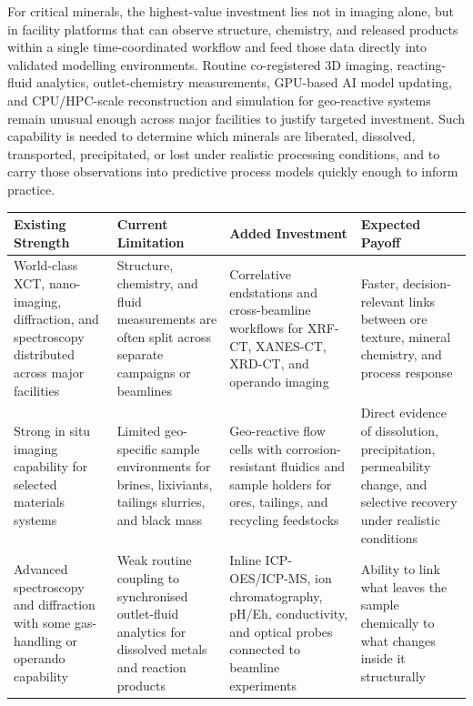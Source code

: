 \documentclass[12pt,a4paper]{article}
\begin{document}
For critical minerals, the highest-value investment lies not in imaging alone, but in facility platforms that can observe structure, chemistry, and released products within a single time-coordinated workflow and feed those data directly into validated modelling environments. Routine co-registered 3D imaging, reacting-fluid analytics, outlet-chemistry measurements, GPU-based AI model updating, and CPU/HPC-scale reconstruction and simulation for geo-reactive systems remain unusual enough across major facilities to justify targeted investment. Such capability is needed to determine which minerals are liberated, dissolved, transported, precipitated, or lost under realistic processing conditions, and to carry those observations into predictive process models quickly enough to inform practice.

\begin{table}[htbp]
\centering
\footnotesize
\setlength{\tabcolsep}{6pt}
\renewcommand{\arraystretch}{1.25}
\begin{tabularx}{\textwidth}{L{0.18\textwidth}Y Y Y}
\toprule
\textbf{Existing Strength} & \textbf{Current Limitation} & \textbf{Added Investment} & \textbf{Expected Payoff} \\
\midrule
World-class XCT, nano-imaging, diffraction, and spectroscopy distributed across major facilities & Structure, chemistry, and fluid measurements are often split across separate campaigns or beamlines & Correlative endstations and cross-beamline workflows for XRF-CT, XANES-CT, XRD-CT, and operando imaging & Faster, decision-relevant links between ore texture, mineral chemistry, and process response \\
Strong in situ imaging capability for selected materials systems & Limited geo-specific sample environments for brines, lixiviants, tailings slurries, and black mass & Geo-reactive flow cells with corrosion-resistant fluidics and sample holders for ores, tailings, and recycling feedstocks & Direct evidence of dissolution, precipitation, permeability change, and selective recovery under realistic conditions \\
Advanced spectroscopy and diffraction with some gas-handling or operando capability & Weak routine coupling to synchronised outlet-fluid analytics for dissolved metals and reaction products & Inline ICP-OES/ICP-MS, ion chromatography, pH/Eh, conductivity, and optical probes connected to beamline experiments & Ability to link what leaves the sample chemically to what changes inside it structurally \\

\end{tabularx}
\end{table}
\end{document}
